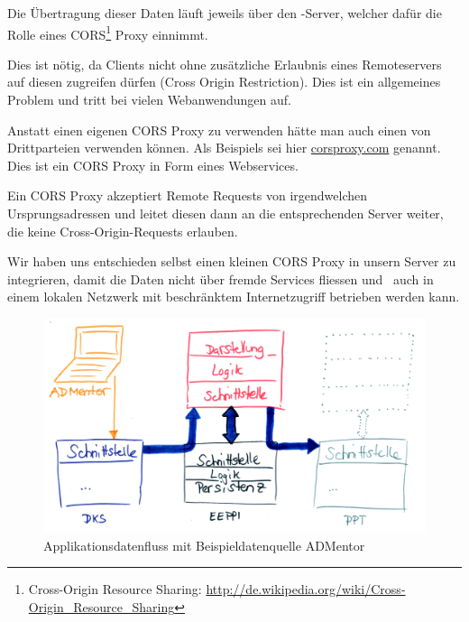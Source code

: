 		Die Übertragung dieser Daten läuft jeweils über den \eeppi-Server, welcher dafür die Rolle eines CORS\footnote{Cross-Origin Resource Sharing: \url{http://de.wikipedia.org/wiki/Cross-Origin_Resource_Sharing}} Proxy einnimmt. 
		
		Dies ist nötig, da Clients nicht ohne zusätzliche Erlaubnis eines Remoteservers
		auf diesen zugreifen dürfen (Cross Origin Restriction).
		Dies ist ein allgemeines Problem und tritt bei vielen Webanwendungen auf.
		
		Anstatt einen eigenen CORS Proxy zu verwenden hätte man auch einen von Drittparteien verwenden können.
		Als Beispiels sei hier \hyperlink{http://www.corsproxy.com/}{corsproxy.com} genannt.
		Dies ist ein CORS Proxy in Form eines Webservices.

		Ein CORS Proxy akzeptiert Remote Requests von irgendwelchen Ursprungsadressen und leitet diesen dann
		an die entsprechenden Server weiter, die keine Cross-Origin-Requests erlauben.
		
		Wir haben uns entschieden selbst einen kleinen CORS Proxy in unsern Server zu integrieren,
		damit die Daten nicht über fremde Services fliessen und
		\eeppi\ auch in einem lokalen Netzwerk mit beschränktem Internetzugriff betrieben werden kann.
		
		\begin{figure}[H]
			\includegraphics[width=\textwidth]{architecture/media/img/eeppiDataflow.jpg}
			\centering
			\caption{Applikationsdatenfluss mit Beispieldatenquelle ADMentor}
			\label{fig:applicationDataFlow}
		\end{figure}		